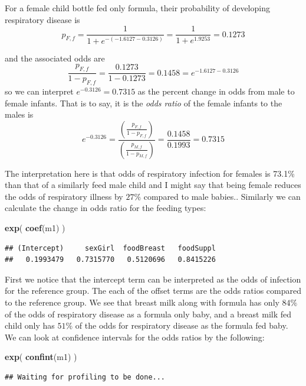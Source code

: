\documentclass[]{book}
\newenvironment{Shaded}{\begin{snugshade}}{\end{snugshade}}
\newcommand{\KeywordTok}[1]{\textcolor[rgb]{0.13,0.29,0.53}{\textbf{{#1}}}}
\newcommand{\NormalTok}[1]{{#1}}
\theoremstyle{definition}
\theoremstyle{definition}
\theoremstyle{remark}
\begin{document}
For a female child bottle fed only formula, their probability of
developing respiratory disease is
\[p_{F,f}=\frac{1}{1+e^{-(-1.6127-0.3126)}}=\frac{1}{1+e^{1.9253}}=0.1273\]

and the associated odds are
\[\frac{p_{F,f}}{1-p_{F,f}}=\frac{0.1273}{1-0.1273}=0.1458=e^{-1.6127-0.3126}\]
so we can interpret \(e^{-0.3126}=0.7315\) as the percent change in odds
from male to female infants. That is to say, it is the \emph{odds ratio}
of the female infants to the males is
\[e^{-0.3126}=\frac{\left(\frac{p_{F,f}}{1-p_{F,f}}\right)}{\left(\frac{p_{M,f}}{1-p_{M,f}}\right)}=\frac{0.1458}{0.1993}=0.7315\]

The interpretation here is that odds of respiratory infection for
females is 73.1\% than that of a similarly feed male child and I might
say that being female reduces the odds of respiratory illness by
\(27\%\) compared to male babies.. Similarly we can calculate the change
in odds ratio for the feeding types:

\begin{Shaded}
\begin{Highlighting}[]
\KeywordTok{exp}\NormalTok{( }\KeywordTok{coef}\NormalTok{(m1) )}
\end{Highlighting}
\end{Shaded}

\begin{verbatim}
## (Intercept)     sexGirl  foodBreast   foodSuppl 
##   0.1993479   0.7315770   0.5120696   0.8415226
\end{verbatim}

First we notice that the intercept term can be interpreted as the odds
of infection for the reference group. The each of the offset terms are
the odds ratios compared to the reference group. We see that breast milk
along with formula has only \(84\%\) of the odds of respiratory disease
as a formula only baby, and a breast milk fed child only has \(51\%\) of
the odds for respiratory disease as the formula fed baby. We can look at
confidence intervals for the odds ratios by the following:

\begin{Shaded}
\begin{Highlighting}[]
\KeywordTok{exp}\NormalTok{( }\KeywordTok{confint}\NormalTok{(m1) )}
\end{Highlighting}
\end{Shaded}

\begin{verbatim}
## Waiting for profiling to be done...
\end{verbatim}
\end{document}
